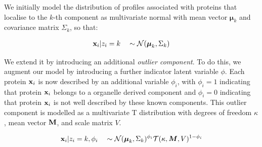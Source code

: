 \begin{frame}{}

    We initially model the distribution of profiles associated with
    proteins that localise to the $k$-th component as multivariate
    normal with mean vector $\boldsymbol{\mu}_k$ and covariance matrix
    $\Sigma_k$, so that:

    \begin{align}
      {\bf x}_i | z_i = k \quad \sim \mathcal{N}(\boldsymbol{\mu}_k, \Sigma_k) \label{equation::preq}
    \end{align}

    \pause

    We extend it by introducing an additional \textit{outlier
      component}. To do this, we augment our model by introducing a
    further indicator latent variable $\phi$. Each protein ${\bf x}_i$
    is now described by an additional variable $\phi_i$, with $\phi_i
    = 1$ indicating that protein ${\bf x}_i$ belongs to a organelle
    derived component and $\phi_i = 0$ indicating that protein ${\bf
      x}_i$ is not well described by these known components. This
    outlier component is modelled as a multivariate T distribution
    with degrees of freedom $\kappa$, mean vector $\bf{M}$, and scale
    matrix $V$.

    \begin{align}
      {\bf x}_i | z_i = k, \phi_i \quad \sim \mathcal{N}(\boldsymbol{\mu}_k, \Sigma_k)^{\phi_i}\mathcal{T}(\kappa, \boldsymbol{M}, V)^{1 - \phi_i }
    \end{align}


\end{frame}


